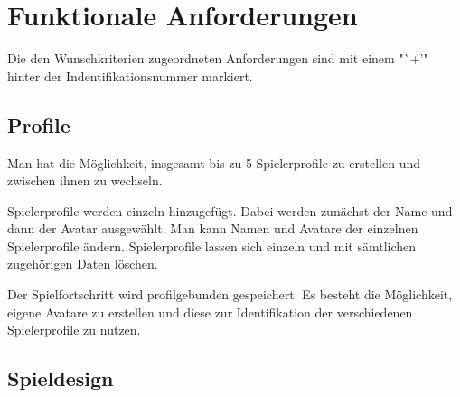 \section{Funktionale Anforderungen}

Die den Wunschkriterien zugeordneten Anforderungen sind mit einem "`+'" hinter der Indentifikationsnummer markiert.

\subsection{Profile}

\begin{requirements}
	Man hat die Möglichkeit, insgesamt bis zu 5 Spielerprofile zu erstellen und zwischen ihnen zu wechseln.
	\begin{requirements}
		 Spielerprofile werden einzeln hinzugefügt. Dabei werden zunächst der Name und dann der Avatar ausgewählt.
		 Man kann Namen und Avatare der einzelnen Spielerprofile ändern.
		 Spielerprofile lassen sich einzeln und mit sämtlichen zugehörigen Daten löschen.
	\end{requirements}
	 Der Spielfortschritt wird profilgebunden gespeichert.
	Es besteht die Möglichkeit, eigene Avatare zu erstellen und diese zur Identifikation der verschiedenen Spielerprofile zu nutzen.
\end{requirements}

\subsection{Spieldesign}

